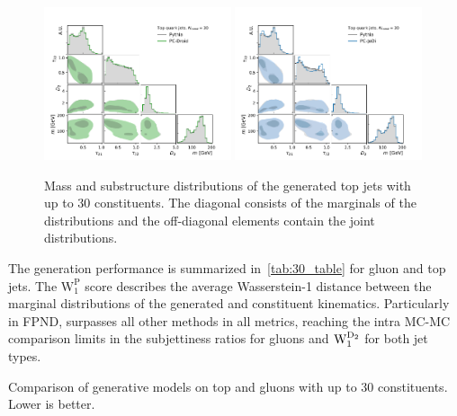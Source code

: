 \begin{figure}[htpb]
    \centering
    \includegraphics[width=0.49\textwidth]{Figures/jet_generation/droid/30/hlvs/t/100/hlv_corr_PC-Droid.pdf}
    \includegraphics[width=0.49\textwidth]{Figures/jet_generation/droid/30/hlvs/t/100/hlv_corr_PC-Jedi.pdf}
    \caption{
        Mass and substructure distributions of the generated top jets with up to 30 constituents.
        The diagonal consists of the marginals of the distributions and the off-diagonal elements contain the joint distributions.
    }
    \label{fig:hlvs-30}
\end{figure}

The generation performance is summarized in~\cref{tab:30_table} for gluon and top jets.
The $\mathrm{W_1^P}$ score describes the average Wasserstein-1 distance between the marginal distributions of the generated and \pythia constituent kinematics.
Particularly in FPND, \pcdroid surpasses all other methods in all metrics, reaching the intra MC-MC comparison limits in the subjettiness ratios for gluons and $\mathrm{W_1^{\text{D}_2}}$ for both jet types.

\begin{table}[tp]
    \centering
    \caption{Comparison of generative models on top and gluons with up to 30 constituents. Lower is better.}
    \label{tab:30_table}
    \renewcommand{\arraystretch}{1.5}
    \resizebox{\textwidth}{!}{%
        
    }
\end{table}

